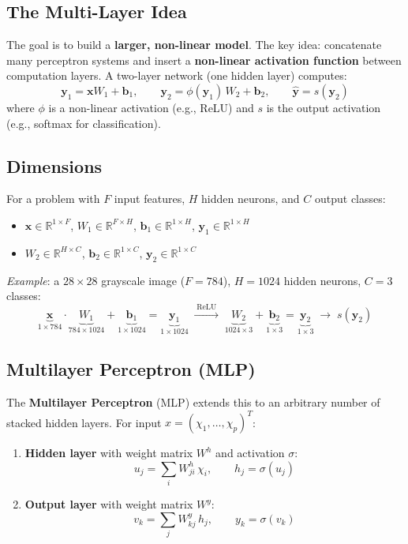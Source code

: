 \documentclass[11pt,a4paper]{article}
\theoremstyle{definition}
\theoremstyle{plain}
\theoremstyle{remark}
\newcommand{\R}{\mathbb{R}}
\begin{document}
\subsection{The Multi-Layer Idea}

The goal is to build a \textbf{larger, non-linear model}. The key idea: concatenate many perceptron systems and insert a \textbf{non-linear activation function} between computation layers. A two-layer network (one hidden layer) computes:
\[
    \mathbf{y}_1 = \mathbf{x} W_1 + \mathbf{b}_1, \qquad
    \mathbf{y}_2 = \phi(\mathbf{y}_1)\, W_2 + \mathbf{b}_2, \qquad
    \hat{\mathbf{y}} = s(\mathbf{y}_2)
\]
where $\phi$ is a non-linear activation (e.g., ReLU) and $s$ is the output activation (e.g., softmax for classification).

\subsection{Dimensions}

For a problem with $F$ input features, $H$ hidden neurons, and $C$ output classes:
\begin{itemize}
    \item $\mathbf{x} \in \R^{1 \times F}$, $W_1 \in \R^{F \times H}$, $\mathbf{b}_1 \in \R^{1 \times H}$, $\mathbf{y}_1 \in \R^{1 \times H}$
    \item $W_2 \in \R^{H \times C}$, $\mathbf{b}_2 \in \R^{1 \times C}$, $\mathbf{y}_2 \in \R^{1 \times C}$
\end{itemize}

\textit{Example}: a $28{\times}28$ grayscale image ($F=784$), $H=1024$ hidden neurons, $C=3$ classes:
\[
    \underbrace{\mathbf{x}}_{1 \times 784}
    \cdot\underbrace{W_1}_{784 \times 1024}
    + \underbrace{\mathbf{b}_1}_{1 \times 1024}
    = \underbrace{\mathbf{y}_1}_{1 \times 1024}
    \;\xrightarrow{\;\mathrm{ReLU}\;}\;
    \underbrace{W_2}_{1024 \times 3}
    + \underbrace{\mathbf{b}_2}_{1 \times 3}
    = \underbrace{\mathbf{y}_2}_{1 \times 3}
    \;\to\; s(\mathbf{y}_2)
\]

\subsection{Multilayer Perceptron (MLP)}

The \textbf{Multilayer Perceptron} (MLP) extends this to an arbitrary number of stacked hidden layers. For input $x = (\chi_1, \ldots, \chi_p)^T$:
\begin{enumerate}
    \item \textbf{Hidden layer} with weight matrix $W^h$ and activation $\sigma$:
    \[
        u_j = \sum_i W^h_{ji}\,\chi_i, \qquad h_j = \sigma(u_j)
    \]
    \item \textbf{Output layer} with weight matrix $W^y$:
    \[
        v_k = \sum_j W^y_{kj}\,h_j, \qquad y_k = \sigma(v_k)
    \]
\end{enumerate}
\end{document}
